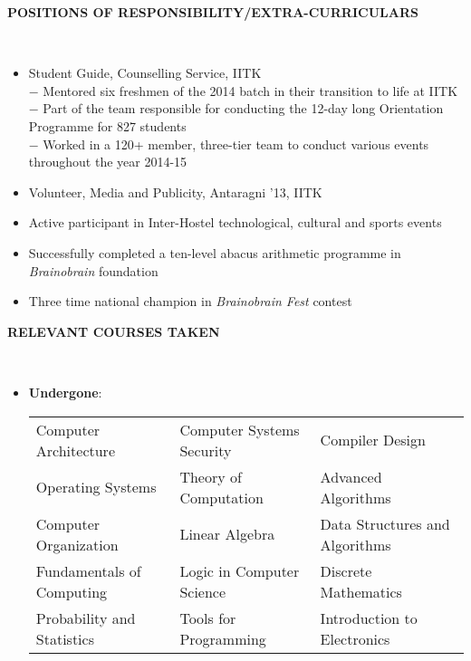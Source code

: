 \documentclass[a4paper,10pt]{article}
\newcommand{\isep}{-2 pt}
\newcommand{\lsep}{-0.5cm}
\newcommand{\resheading}[1]{{\small \colorbox{mygrey}{\begin{minipage}{0.975\textwidth}{\textbf{#1 \vphantom{p\^{E}}}}\end{minipage}}}}
\begin{document}
\resheading{\textbf{POSITIONS OF RESPONSIBILITY/EXTRA-CURRICULARS} }\\[\lsep]
\begin{itemize}\itemsep \isep
\item \noindent Student Guide, Counselling Service, IITK\\
$-$ Mentored six freshmen of the 2014 batch in their transition to life at IITK\\
$-$ Part of the team responsible for conducting the 12-day long Orientation Programme for 827 students\\
$-$ Worked in a 120+ member, three-tier team to conduct various events throughout the year 2014-15
\item \noindent Volunteer, Media and Publicity, Antaragni '13, IITK
\item \noindent Active participant in Inter-Hostel technological, cultural and sports events
\item \noindent Successfully completed a ten-level abacus arithmetic programme in \emph{Brainobrain} foundation
\item \noindent Three time national champion in \emph{Brainobrain Fest} contest
\end{itemize}

\resheading{\textbf{RELEVANT COURSES TAKEN} }\\[\lsep]
\begin{itemize}
\item \textbf{Undergone}:\\
\begin{tabular}{ L{6.7cm} L{6.7cm} L{6.7cm} }
Computer Architecture & Computer Systems Security & Compiler Design\\
Operating Systems & Theory of Computation & Advanced Algorithms\\
Computer Organization & Linear Algebra & Data Structures and Algorithms\\
Fundamentals of Computing & Logic in Computer Science & Discrete Mathematics\\
Probability and Statistics & Tools for Programming & Introduction to Electronics
\end{tabular}

\end{itemize}
\end{document}
